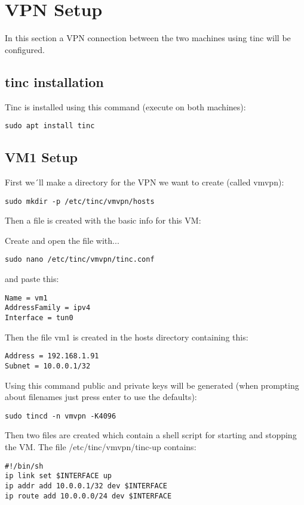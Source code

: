 \documentclass[10pt,a4paper]{article}
\begin{document}
\newpage
\section{VPN Setup}
In this section a VPN connection between the two machines using tinc will be configured.

\subsection{tinc installation}
Tinc is installed using this command (execute on both machines):
\begin{verbatim}
sudo apt install tinc
\end{verbatim}

\subsection{VM1 Setup}
First we´ll make a directory for the VPN we want to create (called vmvpn):
\begin{verbatim}
sudo mkdir -p /etc/tinc/vmvpn/hosts
\end{verbatim}

Then a file is created with the basic info for this VM:

Create and open the file with...
\begin{verbatim}
sudo nano /etc/tinc/vmvpn/tinc.conf
\end{verbatim}
and paste this:
\begin{verbatim}
Name = vm1
AddressFamily = ipv4
Interface = tun0
\end{verbatim}

Then the file vm1 is created in the hosts directory containing this:
\begin{verbatim}
Address = 192.168.1.91
Subnet = 10.0.0.1/32
\end{verbatim}

Using this command public and private keys will be generated (when prompting about filenames just press enter to use the defaults):
\begin{verbatim}
sudo tincd -n vmvpn -K4096
\end{verbatim}

Then two files are created which contain a shell script for starting and stopping the VM. The file /etc/tinc/vmvpn/tinc-up contains:
\begin{verbatim}
#!/bin/sh
ip link set $INTERFACE up
ip addr add 10.0.0.1/32 dev $INTERFACE
ip route add 10.0.0.0/24 dev $INTERFACE
\end{verbatim}
\end{document}

